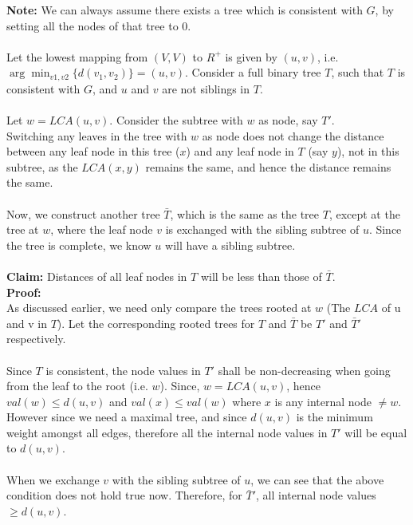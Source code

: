 \documentclass{article}
\begin{document}
        \textbf{Note:} We can always assume there exists a tree which is consistent with $G$, by setting all the nodes of that tree to 0.
        \\
        \\
        Let the lowest mapping from $(V, V)$ to $R^+$ is given by $(u, v)$, i.e. $\arg\min_{v1, v2}\{d(v_1, v_2)\} = (u, v)$. Consider a full binary tree $T$, such that $T$ is consistent with $G$, and $u$ and $v$ are not siblings in $T$.
        \\
        \\
        Let $w = LCA(u, v)$. Consider the subtree with $w$ as node, say $T'$.
        \\
        Switching any leaves in the tree with $w$ as node does not change the distance between any leaf node in this tree ($x$) and any leaf node in $T$ (say $y$), not in this subtree, as the $LCA(x, y)$ remains the same, and hence the distance remains the same.
        \\
        \\
        Now, we construct another tree $\bar{T}$, which is the same as the tree $T$, except at the tree at $w$, where the leaf node $v$ is exchanged with  the sibling subtree of $u$. Since the tree is complete, we know $u$ will have a sibling subtree.
        \\
        \\
        \textbf{Claim: } Distances of all leaf nodes in $T$ will be less than those of $\bar{T}$.
        \\
        \textbf{Proof: }
        \\
        As discussed earlier, we need only compare the trees rooted at $w$ (The $LCA$ of u and v in $T$). Let the corresponding rooted trees for $T$ and $\bar{T}$ be $T'$ and $\bar{T}'$ respectively.
        \\
        \\
        Since $T$ is consistent, the node values in $T'$ shall be non-decreasing when going from the leaf to the root (i.e. $w$). Since, $w = LCA(u, v)$, hence $val(w) \le d(u, v)$ and $val(x) \le val(w)$ where $x$ is any internal node $\ne w$. However since we need a maximal tree, and since $d(u, v)$ is the minimum weight amongst all edges, therefore all the internal node values in $T'$ will be equal to $d(u, v)$.
        \\
        \\
        When we exchange $v$ with the sibling subtree of $u$, we can see that the above condition does not hold true now. Therefore, for $\bar{T}'$, all internal node values $\ge d(u, v)$.
\end{document}
